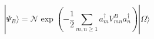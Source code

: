 \begin{equation}
|\Psi _{B}\rangle =\mathcal{N}\exp \left( -{\frac{1}{2}}\sum_{m,n\geq
1}a_{m}^{\dagger }V_{mn}^{B}a_{n}^{\dagger }\right) |\Omega \rangle
\end{equation}

